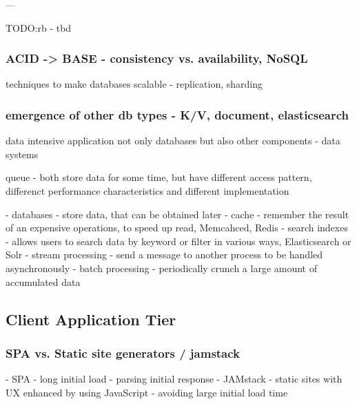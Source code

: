 ---

TODO:rb - tbd


\subsubsection*{ACID -> BASE - consistency vs. availability, NoSQL}

techniques to make databases scalable - replication, sharding

\subsubsection*{emergence of other db types - K/V, document, elasticsearch}


data intensive application
not only databases but also other components - data systems

queue - both store data for some time, but have different access pattern, differenct performance characteristics and different implementation

- databases - store data, that can be obtained later
- cache - remember the result of an expensive operations, to speed up read, Memcahced, Redis
- search indexes - allows users to search data by keyword or filter in various ways, Elasticsearch or Solr
- stream processing - send a message to another process to be handled asynchronously
- batch processing - periodically crunch a large amount of accumulated data

\subsection*{Client Application Tier}

\subsubsection*{SPA vs. Static site generators / jamstack}

- SPA - long initial load - parsing initial response
- JAMstack - static sites with UX enhanced by using JavaScript - avoiding large initial load time


